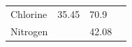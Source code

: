 \begin{enumerate}[noitemsep, label=\textbf{\arabic*}. ]
{\begin{tabular}[t]{|l|l|l|l|}
    
        Chlorine &
    
    
        35.45 &
    
    
        70.9 &
    
    
     \tabularnewline\cline{1-1}\cline{2-2}\cline{3-3}\cline{4-4}
    
    
        Nitrogen &
    
    
         &
    
    
        42.08 &
    
    
     \tabularnewline\cline{1-1}\cline{2-2}\cline{3-3}\cline{4-4}
    \end{tabular}} %
\end{enumerate}
